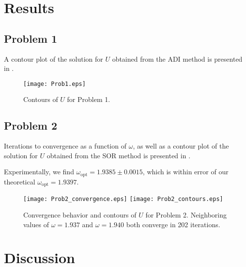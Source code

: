 \documentclass[11pt]{article}
\begin{document}
\section{Results} %

\subsection{Problem 1}

A contour plot of the solution for $U$ obtained from the ADI method is presented in .

\begin{figure}[h!]
\begin{center}
\texttt{[image: Prob1.eps]}
\\[0.5cm]
\caption{Contours of $U$ for Problem 1.}
\label{fig:Prob1}
\end{center}
\end{figure}

\subsection{Problem 2}

Iterations to convergence as a function of $\omega$, as well as a contour plot of the solution for $U$ obtained from the SOR method is presented in .

Experimentally, we find $\omega_\text{opt} = 1.9385 \pm 0.0015$, which is within error of our theoretical $\omega_\text{opt} = 1.9397$.

\begin{figure}[h!]
\begin{center}
\texttt{[image: Prob2\_convergence.eps]}
\texttt{[image: Prob2\_contours.eps]}
\\[0.5cm]
\caption{Convergence behavior and contours of $U$ for Problem 2. Neighboring values of $\omega = 1.937$ and $\omega = 1.940$ both converge in 202 iterations.}
\label{fig:Prob2}
\end{center}
\end{figure}

\section{Discussion} %
\end{document}
